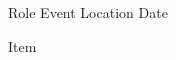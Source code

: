 

\begin{cventries}

  \cventry
  {Role} %
  {Event} %
  {Location} %
  {Date} %
  {
    \begin{cvitems} %
      \item {Item}
    \end{cvitems}
  }

\end{cventries}
